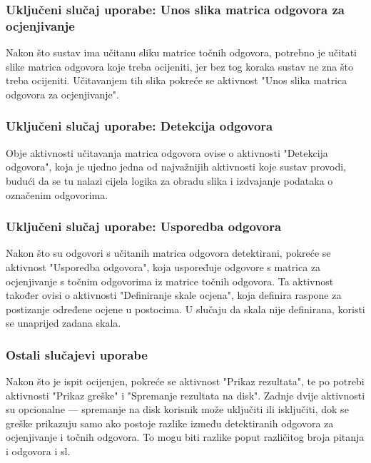 \documentclass{foi}
\begin{document}
\subsubsection{Uključeni slučaj uporabe: Unos slika matrica odgovora za ocjenjivanje}
Nakon što sustav ima učitanu sliku matrice točnih odgovora, potrebno je učitati slike matrica odgovora koje treba ocijeniti, jer bez tog koraka sustav ne zna što treba ocijeniti. Učitavanjem tih slika pokreće se aktivnost "Unos slika matrica odgovora za ocjenjivanje".

\subsubsection{Uključeni slučaj uporabe: Detekcija odgovora}
Obje aktivnosti učitavanja matrica odgovora ovise o aktivnosti "Detekcija odgovora", koja je ujedno jedna od najvažnijih aktivnosti koje sustav provodi, budući da se tu nalazi cijela logika za obradu slika i izdvajanje podataka o označenim odgovorima.

\subsubsection{Uključeni slučaj uporabe: Usporedba odgovora}
Nakon što su odgovori s učitanih matrica odgovora detektirani, pokreće se aktivnost "Usporedba odgovora", koja uspoređuje odgovore s matrica za ocjenjivanje s točnim odgovorima iz matrice točnih odgovora. Ta aktivnost također ovisi o aktivnosti "Definiranje skale ocjena", koja definira raspone za postizanje određene ocjene u postocima. U slučaju da skala nije definirana, koristi se unaprijed zadana skala.

\subsubsection{Ostali slučajevi uporabe}
Nakon što je ispit ocijenjen, pokreće se aktivnost "Prikaz rezultata", te po potrebi aktivnosti "Prikaz greške" i "Spremanje rezultata na disk". Zadnje dvije aktivnosti su opcionalne — spremanje na disk korisnik može uključiti ili isključiti, dok se greške prikazuju samo ako postoje razlike između detektiranih odgovora za ocjenjivanje i točnih odgovora. To mogu biti razlike poput različitog broja pitanja i odgovora i sl.
\end{document}
